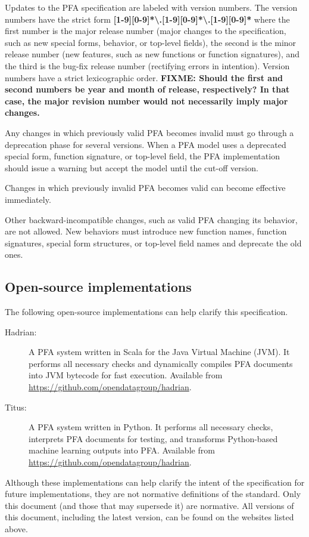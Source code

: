 \documentclass{article}
\newcommand{\PFAc}{\ttfamily\bfseries}
\theoremstyle{definition}
\begin{document}
Updates to the PFA specification are labeled with version numbers. The version numbers have the strict form {\PFAc [1-9][0-9]*\textbackslash.[1-9][0-9]*\textbackslash.[1-9][0-9]*} where the first number is the major release number (major changes to the specification, such as new special forms, behavior, or top-level fields), the second is the minor release number (new features, such as new functions or function signatures), and the third is the bug-fix release number (rectifying errors in intention). Version numbers have a strict lexicographic order. {\bf FIXME: Should the first and second numbers be year and month of release, respectively? In that case, the major revision number would not necessarily imply major changes.}

Any changes in which previously valid PFA becomes invalid must go through a deprecation phase for several versions. When a PFA model uses a deprecated special form, function signature, or top-level field, the PFA implementation should issue a warning but accept the model until the cut-off version.

Changes in which previously invalid PFA becomes valid can become effective immediately.

Other backward-incompatible changes, such as valid PFA changing its behavior, are not allowed. New behaviors must introduce new function names, function signatures, special form structures, or top-level field names and deprecate the old ones.

\subsection{Open-source implementations}

The following open-source implementations can help clarify this specification.
\begin{description}
\item[Hadrian:] A PFA system written in Scala for the Java Virtual Machine (JVM).  It performs all necessary checks and dynamically compiles PFA documents into JVM bytecode for fast execution. Available from \url{https://github.com/opendatagroup/hadrian}.
\item[Titus:] A PFA system written in Python.  It performs all necessary checks, interprets PFA documents for testing, and transforms Python-based machine learning outputs into PFA. Available from \url{https://github.com/opendatagroup/hadrian}.
\end{description}

Although these implementations can help clarify the intent of the specification for future implementations, they are not normative definitions of the standard.  Only this document (and those that may supersede it) are normative.  All versions of this document, including the latest version, can be found on the websites listed above.
\end{document}
